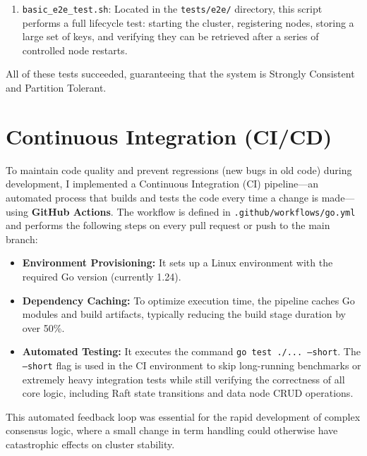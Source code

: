 \documentclass[shortabstract]{iithesis}
\begin{document}
\begin{enumerate}
\begin{itemize}
        \item Fifth part was to expect all Raft nodes to be available after all of these operations from previous subtests 
        \item Sixth part was to write a value to some key and restart data-node holding it. The expected outcome was to data-node to have this value in the memory.
        \item Seventh part was a rerun of second part, to make sure that data-node after restart is still functioning in the intended way.
        \item Eight, final part was to write a value to data-node and then immediately do a read-after-write check whether replica has this data.
    \end{itemize}
    \item \texttt{basic\_e2e\_test.sh}: Located in the \texttt{tests/e2e/} directory, this script performs a full lifecycle test: starting the cluster, registering nodes, storing a large set of keys, and verifying they can be retrieved after a series of controlled node restarts.
\end{enumerate}

\noindent All of these tests succeeded, guaranteeing that the system is Strongly Consistent and Partition Tolerant.

\section{Continuous Integration (CI/CD)}
To maintain code quality and prevent regressions (new bugs in old code) during development, I implemented a Continuous Integration (CI) pipeline—an automated process that builds and tests the code every time a change is made—using \textbf{GitHub Actions}. The workflow is defined in \texttt{.github/workflows/go.yml} and performs the following steps on every pull request or push to the main branch:
\begin{itemize}
    \item \textbf{Environment Provisioning:} It sets up a Linux environment with the required Go version (currently 1.24).
    \item \textbf{Dependency Caching:} To optimize execution time, the pipeline caches Go modules and build artifacts, typically reducing the build stage duration by over 50\%.
    \item \textbf{Automated Testing:} It executes the command \texttt{go test ./... --short}. The \texttt{--short} flag is used in the CI environment to skip long-running benchmarks or extremely heavy integration tests while still verifying the correctness of all core logic, including Raft state transitions and data node CRUD operations.
\end{itemize}
This automated feedback loop was essential for the rapid development of complex consensus logic, where a small change in term handling could otherwise have catastrophic effects on cluster stability.
\end{document}
